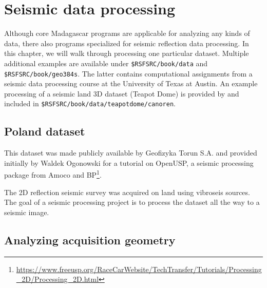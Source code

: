 \chapter{Seismic data processing}

Although core Madagascar programs are applicable for analyzing any
kinds of data, there also programs specialized for seismic reflection
data processing. In this chapter, we will walk through processing one
particular dataset. Multiple additional examples are available under
\texttt{\$RSFSRC/book/data} and \texttt{\$RSFSRC/book/geo384s}. The
latter contains computational assignments from a seismic data
processing course at the University of Texas at Austin. An example
processing of a seismic land 3D dataset (Teapot Dome) is provided by
\cite{oren2018overview} and included in
\texttt{\$RSFSRC/book/data/teapotdome/canoren}.

\section{Poland dataset}

This dataset was made publicly available by Geofizyka Torun S.A. and
provided initially by Waldek Ogonowski for a tutorial on OpenUSP, a
seismic processing package from Amoco and
BP\footnote{\url{https://www.freeusp.org/RaceCarWebsite/TechTransfer/Tutorials/Processing_2D/Processing_2D.html}}.

The 2D reflection seismic survey was acquired on land using vibroseis
sources. The goal of a seismic processing project is to process the
dataset all the way to a seismic image.

\section{Analyzing acquisition geometry}




